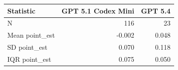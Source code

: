 \begin{tabular}{@{}l r r@{}}
\toprule
Statistic & GPT 5.1 Codex Mini & GPT 5.4 \\
\midrule
N & 116 & 23 \\
Mean point\_est & -0.002 & 0.048 \\
SD point\_est & 0.070 & 0.118 \\
IQR point\_est & 0.075 & 0.050 \\
\bottomrule
\end{tabular}
